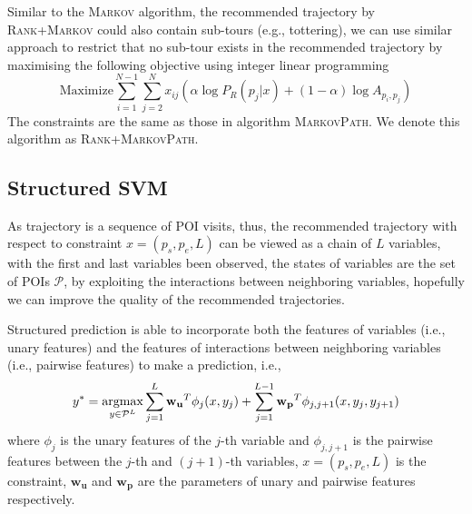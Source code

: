 Similar to the \textsc{Markov} algorithm,
the recommended trajectory by \textsc{Rank+Markov} could also contain sub-tours (e.g., tottering),
we can use similar approach to restrict that no sub-tour exists in the recommended trajectory
by maximising the following objective using integer linear programming
\begin{displaymath}
    \text{Maximize}  \sum_{i=1}^{N-1} \sum_{j=2}^N x_{ij} (\alpha \log P_R(p_j | x) + (1-\alpha) \log A_{p_i, p_j})
\end{displaymath}
The constraints are the same as those in algorithm \textsc{MarkovPath}.
We denote this algorithm as \textsc{Rank+MarkovPath}.

\subsection{Structured SVM}
\label{sec:ssvm}
As trajectory is a sequence of POI visits,
thus, the recommended trajectory with respect to constraint $x = (p_s, p_e, L)$
can be viewed as a chain of $L$ variables,
with the first and last variables been observed, the states of variables are the set of POIs $\mathcal{P}$,
by exploiting the interactions between neighboring variables,
hopefully we can improve the quality of the recommended trajectories.

Structured prediction is able to incorporate both the features of variables (i.e., unary features) and
the features of interactions between neighboring variables (i.e., pairwise features) to make a prediction, i.e.,
\begin{displaymath}
    y^* = \operatorname*{argmax}_{y \in \mathcal{P}^L} \sum_{j=1}^L \mathbf{w_u}^T \phi_j(x, y_j) +
                                        \sum_{j=1}^{L-1} \mathbf{w_p}^T \phi_{j, j+1}(x, y_j, y_{j+1})
\end{displaymath}
where $\phi_j$ is the unary features of the $j$-th variable and $\phi_{j, j+1}$ is the pairwise features between
the $j$-th and $(j+1)$-th variables, $x = (p_s, p_e, L)$ is the constraint, $\mathbf{w_u}$ and $\mathbf{w_p}$ are the
parameters of unary and pairwise features respectively.

